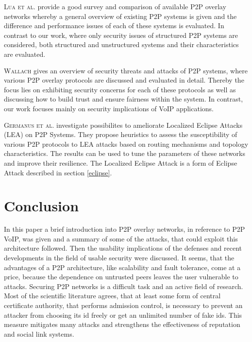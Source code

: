 \documentclass[a4paper,conference]{IEEEtran}
\begin{document}
\textsc{Lua et al.} \cite{lua} provide a good survey and comparison of available
P2P overlay networks whereby a general overview of existing P2P systems is given 
and the difference and performance issues of each of these systems is evaluated. 
In contrast to our work, where only security issues of structured P2P systems are
considered, both structured and unstructured systems and their characteristics
are evaluated. 

\textsc{Wallach} \cite{wallach} gives an overview of security threats and attacks 
of P2P systems, where various P2P overlay protocols are discussed and evaluated
in detail. Thereby the focus lies on exhibiting security concerns for each of these
protocols as well as discussing how to build trust and ensure fairness within 
the system. In contrast, our work focuses mainly on security
implications of VoIP applications.

\textsc{Germanus et al.} \cite{germanus} investigate possibilites to ameliorate Localized Eclipse Attacks (LEA) on P2P Systems. They propose heuristics to
assess the susceptibility of various P2P protocols to LEA attacks based on routing mechanisms and topology characteristics. The results can be used to tune the
parameters of these networks and improve their resilience. The Localized Eclipse Attack is a form of Eclipse Attack described in section \ref{eclipse}.


\section{Conclusion}
\label{conclusion}
In this paper a brief introduction into P2P overlay networks, in reference to
P2P VoIP, was given and a summary of some of the attacks, that could exploit
this
architecture followed. Then the usability implications of the defenses and
recent developments in the field of usable security were discussed. It seems,
that
the advantages of a P2P architecture, like scalability and fault tolerance, come
at a price, because the dependence on untrusted peers leaves the user
vulnerable to attacks. Securing P2P networks is a difficult task and an active
field of research. Most of the scientific literature agrees, that at least
some form of central certificate authority, that performs admission control, is
necessary to prevent an attacker from choosing its id freely or get an unlimited
number of fake ids. This measure mitigates many attacks and strengthens the
effectiveness of reputation and social link systems.
\end{document}
